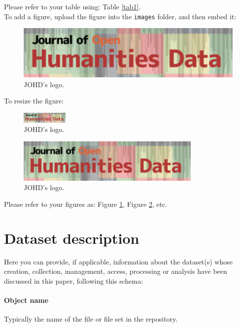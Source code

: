 \documentclass{article}
\begin{document}
\noindent Please refer to your table using: Table \ref{tab1}.\\

\noindent To add a figure, upload the figure into the \texttt{images} folder, and then embed it:

\begin{figure}[H]
\centering
\includegraphics{images/image.jpeg}
\caption{\label{fig1}JOHD's logo.}
\end{figure}

\noindent To resize the figure:

\begin{figure}[H]
\centering
\includegraphics[width=0.2\textwidth]{images/image.jpeg}
\caption{\label{fig2}JOHD's logo.}
\end{figure}

\begin{figure}[H]
\centering
\includegraphics[width=0.8\textwidth]{images/image.jpeg}
\caption{\label{fig3}JOHD's logo.}
\end{figure}

\noindent Please refer to your figures as: Figure \ref{fig1}, Figure \ref{fig2}, etc.


\section{Dataset description}
Here you can provide, if applicable, information about the dataset(s) whose creation, collection, management, access, processing or analysis have been discussed in this paper, following this schema:
\paragraph{Object name} Typically the name of the file or file set in the repository.
\end{document}
